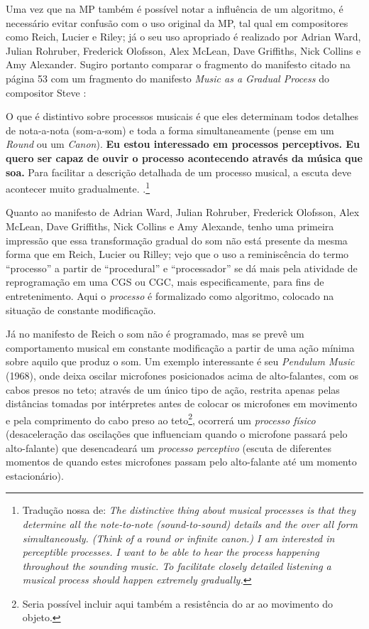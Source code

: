 Uma vez que na MP também é possível notar a influência de um algoritmo, é necessário evitar confusão com o uso original da MP, tal qual em compositores como Reich, Lucier e Riley; já o seu uso apropriado é realizado por Adrian Ward, Julian Rohruber, Frederick Olofsson, Alex McLean, Dave Griffiths, Nick Collins e Amy Alexander. Sugiro portanto comparar o fragmento do manifesto citado na página 53 com um fragmento do manifesto \emph{Music as a Gradual Process} do compositor Steve : 

\begin{citacao}
O que é distintivo sobre processos musicais é que eles determinam todos detalhes de nota-a-nota (som-a-som) e toda a forma simultaneamente (pense em um \emph{Round} ou um \emph{Canon}). \textbf{Eu estou interessado em processos perceptivos. Eu quero ser capaz de ouvir o processo acontecendo através da música que soa.} Para facilitar a descrição detalhada de um processo musical, a escuta  deve acontecer muito gradualmente. \cite[p.~1]{reich_music_1968}.\footnote{Tradução nossa de: \emph{The distinctive thing about musical processes is that they determine all the note-to-note (sound-to-sound) details and the over all form simultaneously. (Think of a round or infinite canon.) I am interested in perceptible processes. I want to be able to hear the  process happening throughout the sounding music. To facilitate closely detailed listening a musical process should happen extremely gradually. }}
\end{citacao}

Quanto ao manifesto de Adrian Ward, Julian Rohruber, Frederick Olofsson, Alex McLean, Dave Griffiths, Nick Collins e Amy Alexande, tenho uma primeira impressão que essa transformação gradual do som não está presente da mesma forma que em Reich, Lucier ou Rilley; vejo que o uso a reminiscência do termo ``processo'' a partir de ``procedural'' e ``processador'' se dá mais pela atividade de reprogramação em uma CGS ou CGC, mais especificamente, para fins de entretenimento. Aqui o \emph{processo} é formalizado como algoritmo, colocado na situação de constante modificação.

Já no manifesto de Reich o som não é programado, mas se prevê um comportamento musical em constante modificação a partir de uma ação mínima sobre aquilo que produz o som. Um exemplo interessante é seu \emph{Pendulum Music} (1968), onde deixa oscilar microfones posicionados acima de alto-falantes, com os cabos presos no teto; através de um único tipo de ação, restrita apenas pelas distâncias tomadas por intérpretes antes de colocar os microfones em movimento e pela comprimento do cabo preso ao teto\footnote{Seria possível incluir aqui também a resistência do ar ao movimento do objeto.}, ocorrerá um \emph{processo físico} (desaceleração das oscilações que influenciam quando o microfone passará pelo alto-falante) que desencadeará um \emph{processo perceptivo} (escuta de diferentes momentos de quando estes microfones passam pelo alto-falante até um momento estacionário). 

